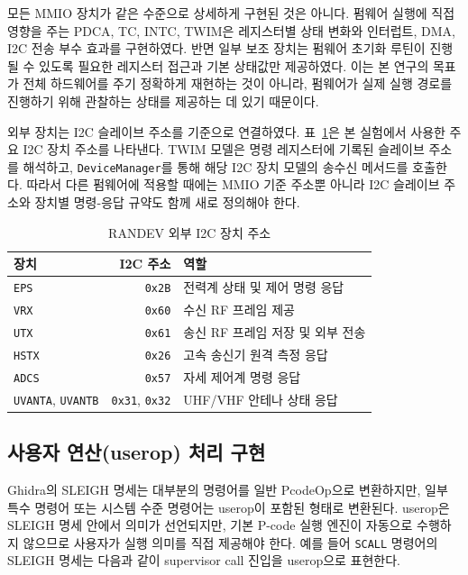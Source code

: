\documentclass[master,korean,final]{kaist-ucs}
\begin{document}
모든 MMIO 장치가 같은 수준으로 상세하게 구현된 것은 아니다. 펌웨어 실행에 직접 영향을 주는 PDCA, TC, INTC, TWIM은 레지스터별 상태 변화와 인터럽트, DMA, I2C 전송 부수 효과를 구현하였다. 반면 일부 보조 장치는 펌웨어 초기화 루틴이 진행될 수 있도록 필요한 레지스터 접근과 기본 상태값만 제공하였다. 이는 본 연구의 목표가 전체 하드웨어를 주기 정확하게 재현하는 것이 아니라, 펌웨어가 실제 실행 경로를 진행하기 위해 관찰하는 상태를 제공하는 데 있기 때문이다.

외부 장치는 I2C 슬레이브 주소를 기준으로 연결하였다. 표~\ref{tab:randev-i2c-map}은 본 실험에서 사용한 주요 I2C 장치 주소를 나타낸다. TWIM 모델은 명령 레지스터에 기록된 슬레이브 주소를 해석하고, \texttt{DeviceManager}를 통해 해당 I2C 장치 모델의 송수신 메서드를 호출한다. 따라서 다른 펌웨어에 적용할 때에는 MMIO 기준 주소뿐 아니라 I2C 슬레이브 주소와 장치별 명령-응답 규약도 함께 새로 정의해야 한다.

\begin{table}[t]
\caption{RANDEV 외부 I2C 장치 주소}
\label{tab:randev-i2c-map}
\begin{center}
\begin{tabular}{lrl}
\hline\hline
장치 & I2C 주소 & 역할 \\
\hline
\texttt{EPS} & \texttt{0x2B} & 전력계 상태 및 제어 명령 응답 \\
\texttt{VRX} & \texttt{0x60} & 수신 RF 프레임 제공 \\
\texttt{UTX} & \texttt{0x61} & 송신 RF 프레임 저장 및 외부 전송 \\
\texttt{HSTX} & \texttt{0x26} & 고속 송신기 원격 측정 응답 \\
\texttt{ADCS} & \texttt{0x57} & 자세 제어계 명령 응답 \\
\texttt{UVANTA}, \texttt{UVANTB} & \texttt{0x31}, \texttt{0x32} & UHF/VHF 안테나 상태 응답 \\
\hline\hline
\end{tabular}
\end{center}
\end{table}

\subsection{사용자 연산(userop) 처리 구현}

Ghidra의 SLEIGH 명세는 대부분의 명령어를 일반 PcodeOp으로 변환하지만, 일부 특수 명령어 또는 시스템 수준 명령어는 userop이 포함된 형태로 변환된다. userop은 SLEIGH 명세 안에서 의미가 선언되지만, 기본 P-code 실행 엔진이 자동으로 수행하지 않으므로 사용자가 실행 의미를 직접 제공해야 한다. 예를 들어 \texttt{SCALL} 명령어의 SLEIGH 명세는 다음과 같이 supervisor call 진입을 userop으로 표현한다.
\end{document}
